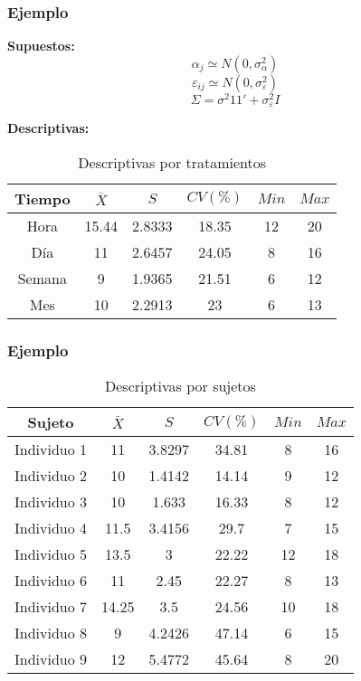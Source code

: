 \documentclass[12pt]{beamer}
\begin{document}
\begin{frame}
\frametitle{Ejemplo}
\textbf{Supuestos:} 
$$\alpha_j \simeq N(0,\sigma^2_\alpha)$$
$$\varepsilon_{ij} \simeq N(0,\sigma^2_\varepsilon)$$
$$\Sigma =\sigma^2 11' + \sigma^2_\varepsilon I$$

\textbf{Descriptivas:}
\begin{table}[htbp]
  \centering
\resizebox{12cm}{!} {
\begin{tabular}{|c|c|c|c|c|c|}
\hline 
\textbf{Tiempo} & \textbf{$\bar{X}$} & \textbf{$S$} & \textbf{$CV(\%)$} & \textbf{$Min$} & \textbf{$Max$}\\ 
\hline 
Hora & 15.44 &2.8333& 18.35& 12 & 20\\
Día & 11 & 2.6457 & 24.05& 8 & 16\\
Semana & 9 &1.9365& 21.51& 6 & 12\\
Mes & 10 &2.2913& 23& 6 & 13 \\
\hline 
\end{tabular} 
}
\caption{Descriptivas por tratamientos}
\label{tab:addlabel}%
\end{table}%
\end{frame}

\begin{frame}
\frametitle{Ejemplo}
\begin{table}[htbp]
  \centering
\resizebox{12cm}{!} {
\begin{tabular}{|c|c|c|c|c|c|}
\hline 
\textbf{Sujeto} & \textbf{$\bar{X}$} & \textbf{$S$} & \textbf{$CV(\%)$} & \textbf{$Min$} & \textbf{$Max$}\\ 
\hline 
Individuo 1 & 11 &3.8297 &34.81& 8 & 16\\
Individuo 2 & 10 &1.4142 & 14.14& 9 & 12\\
Individuo 3 & 10 &1.633 & 16.33& 8 & 12\\
Individuo 4 & 11.5    &3.4156 & 29.7& 7 & 15\\
Individuo 5 & 13.5    &3 & 22.22& 12 & 18\\
Individuo 6 & 11    &2.45 & 22.27& 8 & 13\\
Individuo 7 & 14.25    &3.5 &24.56& 10 & 18\\
Individuo 8 &  9   &4.2426 & 47.14& 6 & 15\\
Individuo 9 &12    &5.4772 & 45.64& 8 & 20\\
\hline 
\end{tabular} 
}
\caption{Descriptivas por sujetos}
\label{tab:addlabel}%
\end{table}%
\end{frame}
\end{document}
